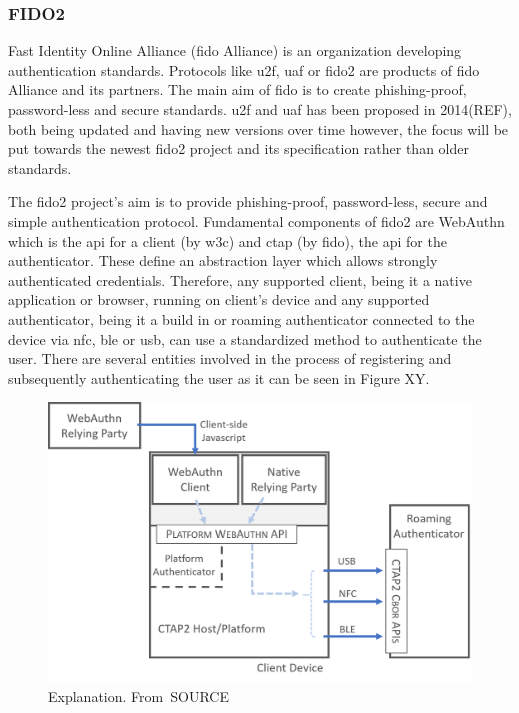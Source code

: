 \subsubsection{FIDO2}

Fast Identity Online Alliance (\acrshort{fido} Alliance) is an organization developing authentication standards. Protocols like \acrfull{u2f}, \acrfull{uaf} or \acrshort{fido}2 are products of \acrshort{fido} Alliance and its partners. The main aim of \acrshort{fido} is to create phishing-proof, password-less and secure standards. \acrshort{u2f} and \acrshort{uaf} has been proposed in 2014(REF), both being updated and having new versions over time however, the focus will be put towards the newest \acrshort{fido}2 project and its specification rather than older standards.

The \acrshort{fido}2 project’s aim is to provide phishing-proof, password-less, secure and simple authentication protocol. Fundamental components of \acrshort{fido}2 are WebAuthn which is the \acrshort{api} for a client (by \acrshort{w3c}) and \acrshort{ctap} (by \acrshort{fido}), the \acrshort{api} for the authenticator. These define an abstraction layer which allows strongly authenticated credentials. Therefore, any supported client, being it a native application or browser, running on client’s device and any supported authenticator, being it a build in or roaming authenticator connected to the device via \acrshort{nfc}, \acrshort{ble} or \acrshort{usb}, can use a standardized method to authenticate the user. There are several entities involved in the process of registering and subsequently authenticating the user as it can be seen in Figure XY.

\begin{figure}[ht]
    \centering
    \includegraphics[width=.95\textwidth]{00images/FIDO2_Overview.png}
    \caption{Explanation. From~\cite{}SOURCE}
    \label{fig:fido2_overview}
\end{figure}

